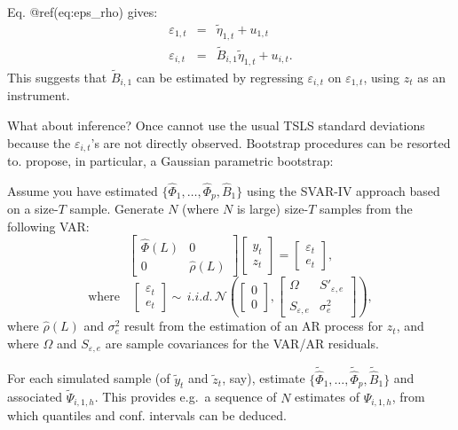 \documentclass[
]{book}
\theoremstyle{definition}
\theoremstyle{definition}
\theoremstyle{definition}
\theoremstyle{definition}
\theoremstyle{remark}
\begin{document}
Eq. @ref(eq:eps\_rho) gives:
\begin{eqnarray*}
\varepsilon_{1,t} &=& \tilde\eta_{1,t} + u_{1,t}\\
\varepsilon_{i,t} &=& \tilde{B}_{i,1} \tilde\eta_{1,t} + u_{i,t}.
\end{eqnarray*}
This suggests that \(\tilde{B}_{i,1}\) can be estimated by regressing \(\varepsilon_{i,t}\) on \(\varepsilon_{1,t}\), using \(z_t\) as an instrument.

What about inference? Once cannot use the usual TSLS standard deviations because the \(\varepsilon_{i,t}\)'s are not directly observed. Bootstrap procedures can be resorted to. \citet{Stock_Watson_2018} propose, in particular, a Gaussian parametric bootstrap:

Assume you have estimated \(\{\widehat{\Phi}_1,\dots,\widehat{\Phi}_p,\widehat{B}_1\}\) using the SVAR-IV approach based on a size-\(T\) sample. Generate \(N\) (where \(N\) is large) size-\(T\) samples from the following VAR:
\[
\left[
\begin{array}{cc}
\widehat{\Phi}(L) & 0 \\
0 & \widehat{\rho}(L)
\end{array}
\right]
\left[
\begin{array}{c}
y_t \\
z_t
\end{array}
\right] =
\left[
\begin{array}{c}
\varepsilon_t \\
e_t
\end{array}
\right],
\]
\[
\mbox{where} \quad \left[
\begin{array}{c}
\varepsilon_t \\
e_t
\end{array}
\right]\sim \, i.i.d.\,\mathcal{N}\left(\left[\begin{array}{c}0\\0\end{array}\right],
\left[\begin{array}{cc}
\Omega & S'_{\varepsilon,e}\\
S_{\varepsilon,e}& \sigma^2_{e}
\end{array}\right]
\right),
\]
where \(\widehat{\rho}(L)\) and \(\sigma^2_{e}\) result from the estimation of an AR process for \(z_t\), and where \(\Omega\) and \(S_{\varepsilon,e}\) are sample covariances for the VAR/AR residuals.

For each simulated sample (of \(\tilde{y}_t\) and \(\tilde{z}_t\), say), estimate \(\{\widetilde{\widehat{\Phi}}_1,\dots,\widetilde{\widehat{\Phi}}_p,\widetilde{\widehat{B}}_1\}\) and associated \(\widetilde{\Psi}_{i,1,h}\). This provides e.g.~a sequence of \(N\) estimates of \(\Psi_{i,1,h}\), from which quantiles and conf. intervals can be deduced.
\end{document}
